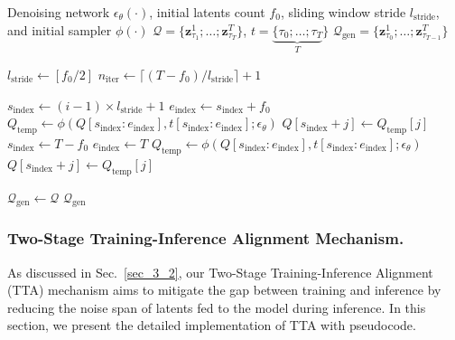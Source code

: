 \documentclass{article}
\theoremstyle{plain}
\theoremstyle{definition}
\theoremstyle{remark}
\begin{document}
\begin{algorithm}[htbp]
\caption{One-step inference over the latents queue in FIFO-Diffusion}
\label{alg:fifo_slide_window}
\begin{algorithmic}[1]

 Denoising network $\epsilon_{\theta}(\cdot)$, initial latents count $f_0$, sliding window stride $l_{\mathrm{stride}}$, and initial sampler $\phi(\cdot)$
 $\mathcal{Q}=\{\mathbf{z}_{\tau_1}^1; \dots; \mathbf{z}_{\tau_T}^T\}$, $t=\underbrace{\{\tau_{0}; \dots; \tau_{T}}_{T}\}$
 $\mathcal{Q}_\mathrm{gen}=\{\mathbf{z}_{\tau_0}^1; \dots; \mathbf{z}_{\tau_{T-1}}^T\}$
\STATE {\bfseries \textcolor{blue}{\# Queue length equals denoising steps $T$.}}

\STATE $l_\mathrm{stride} \gets [f_0/2]$
\STATE $n_\mathrm{iter} \gets \lceil (T-f_0) / l_\mathrm{stride} \rceil + 1$

        \STATE $s_\mathrm{index} \gets (i-1)\times l_\mathrm{stride}+1$
        \STATE $e_\mathrm{index} \gets s_\mathrm{index} + f_{0}$
        \STATE $Q_\mathrm{temp} \gets \phi(Q[s_\mathrm{index}:e_\mathrm{index}], t[s_\mathrm{index}:e_\mathrm{index}]; \epsilon_{\theta})$
            \STATE $Q[s_\mathrm{index}+ j] \gets Q_\mathrm{temp}[j]$
        \ENDFOR
    \ELSE
        \STATE $s_\mathrm{index} \gets T - f_0$
        \STATE $e_\mathrm{index} \gets T$
        \STATE $Q_\mathrm{temp} \gets \phi(Q[s_\mathrm{index}:e_\mathrm{index}], t[s_\mathrm{index}:e_\mathrm{index}]; \epsilon_{\theta})$
            \STATE $Q[s_\mathrm{index}+ j] \gets Q_\mathrm{temp}[j]$
        \ENDFOR
    \ENDIF
\ENDFOR

\STATE $\mathcal{Q}_\mathrm{gen} \gets \mathcal{Q}$
 $\mathcal{Q}_\mathrm{gen}$

\end{algorithmic}
\end{algorithm}


\subsubsection{Two-Stage Training-Inference Alignment Mechanism.}
\label{app:pseudocode_2stages}

As discussed in Sec.~\ref{sec_3_2}, our Two-Stage Training-Inference Alignment (TTA) mechanism aims to mitigate the gap between training and inference by reducing the noise span of latents fed to the model during inference. In this section, we present the detailed implementation of TTA with pseudocode.
\end{document}
